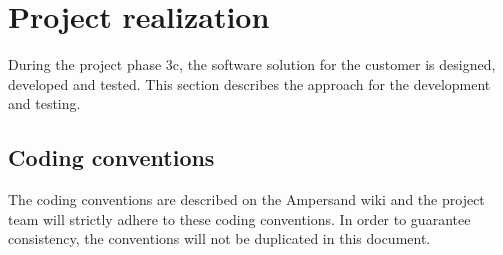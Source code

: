 \section{Project realization}
\label{sec:project-realization}
%
During the project phase 3c, the software solution for the customer is designed, developed and tested.
This section describes the approach for the development and testing.

\subsection{Coding conventions}
\label{subsec:coding-conventions}
%
The coding conventions are described on the Ampersand wiki \cite{coding-conventions} and the project team will strictly adhere to these coding conventions.
In order to guarantee consistency, the conventions will not be duplicated in this document.

